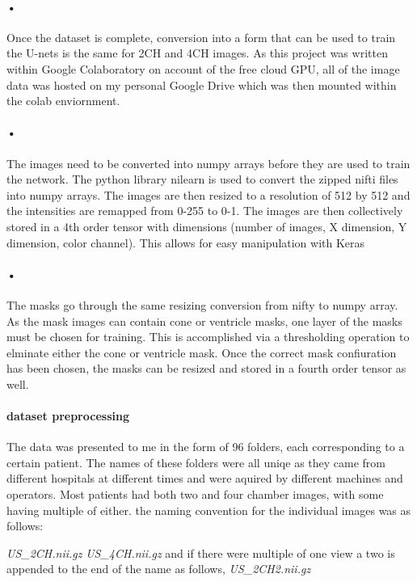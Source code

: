 \documentclass{article}
\begin{document}
{\paragraph{•}
Once the dataset is complete, conversion into a form that can be used to train the U-nets is the same for 2CH and 4CH images. As this project was written within Google Colaboratory on account of the free cloud GPU, all of the image data was hosted on my personal Google Drive which was then mounted within the colab enviornment. 
\paragraph{•}
The images need to be converted into numpy arrays before they are used to train the network. The python library nilearn is used to convert the zipped nifti files into numpy arrays. The images are then resized to a resolution of 512 by 512 and the intensities are remapped from 0-255 to 0-1. The images are then collectively stored in a 4th order tensor with dimensions (number of images, X dimension, Y dimension, color channel). This allows for easy manipulation with Keras
\paragraph{•}
The masks go through the same resizing conversion from nifty to numpy array. As the mask images can contain cone or ventricle masks, one layer of the masks must be chosen for training. This is accomplished via a thresholding operation to elminate either the cone or ventricle mask. Once the correct mask confiuration has been chosen, the masks can be resized and stored in a fourth order tensor as well.
\paragraph{dataset preprocessing}
The data was presented to me in the form of 96 folders, each corresponding to a certain patient.
The names of these folders were all uniqe as they came from different hospitals at different times and were aquired by different machines and operators.
Most patients had both two and four chamber images, with some having multiple of either. 
the naming convention for the individual images was as follows:

\textit{US\_2CH.nii.gz}
\textit{US\_4CH.nii.gz}
and if there were multiple of one view a two is appended to the end of the name as follows,
\textit{US\_2CH2.nii.gz}

}
\end{document}
